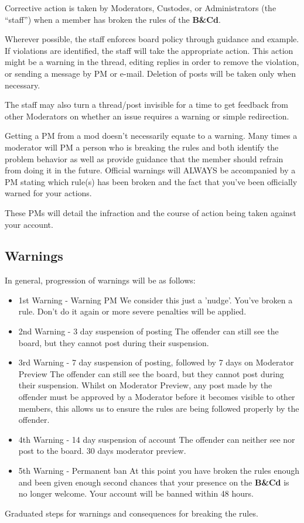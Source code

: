 \documentclass[12pt]{article}
\newcommand{\BnC}{{\textbf{B\&Cd}}}%
\begin{document}
Corrective action is taken by Moderators, Custodes, or Administrators 
(the ``staff'') when a member has broken the rules of the {\BnC}.

Wherever possible, the staff enforces board policy through guidance and 
example. If violations are identified, the staff will take the 
appropriate action. This action might be a warning in the thread, 
editing replies in order to remove the violation, or sending a message 
by PM or e-mail. Deletion of posts will be taken only when necessary.

The staff may also turn a thread/post invisible for a time to get 
feedback from other Moderators on whether an issue requires a warning 
or simple redirection.

Getting a PM from a mod doesn't necessarily equate to a warning. Many 
times a moderator will PM a person who is breaking the rules and both 
identify the problem behavior as well as provide guidance that the 
member should refrain from doing it in the future. Official warnings 
will ALWAYS be accompanied by a PM stating which rule(s) has been 
broken and the fact that you've been officially warned for your actions.

These PMs will detail the infraction and the course of action being 
taken against your account.

\subsection{Warnings}

In general, progression of warnings will be as follows:

\begin{table}[H]

\begin{itemize}

\item 1st Warning - Warning PM
We consider this just a 'nudge'. You've broken a rule. Don't do it 
again or more severe penalties will be applied.
\item 2nd Warning - 3 day suspension of posting
The offender can still see the board, but they cannot post during their 
suspension.
\item 3rd Warning - 7 day suspension of posting, followed by 7 days on 
Moderator Preview
The offender can still see the board, but they cannot post during their 
suspension. Whilst on Moderator Preview, any post made by the offender 
must be approved by a Moderator before it becomes visible to other 
members, this allows us to ensure the rules are being followed properly 
by the offender.
\item 4th Warning - 14 day suspension of account
The offender can neither see nor post to the board. 30 days moderator 
preview.
\item 5th Warning - Permanent ban
At this point you have broken the rules enough and been given enough 
second chances that your presence on the {\BnC} is no longer welcome. Your 
account will be banned within 48 hours.
\end{itemize}
 \caption{Graduated steps for warnings and consequences for breaking the rules.}
\end{table}
\end{document}
